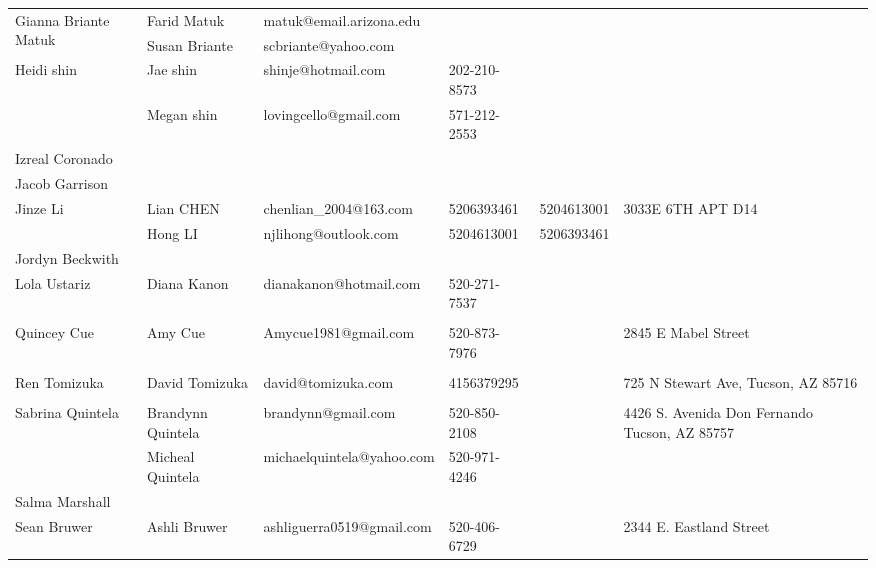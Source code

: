 \documentclass[landscape]{article}\usepackage[]{graphicx}\usepackage[]{color}
\begin{document}
\begin{longtable}{|p{100pt}|p{100pt}|p{140pt}|p{60pt}|p{64pt}|p{120pt}|}
\hline
\multirow{2}{100pt}{Gianna Briante Matuk} & Farid Matuk & matuk@email.arizona.edu &  &  & \multirow{2}{120pt}{} \\
 & Susan Briante & scbriante@yahoo.com &  &  & \\
\hline
\multirow{2}{100pt}{Heidi shin} & Jae shin & shinje@hotmail.com & 202-210-8573 &  & \multirow{2}{120pt}{} \\
 & Megan shin & lovingcello@gmail.com & 571-212-2553 &  & \\
\hline
\multirow{2}{100pt}{Izreal Coronado} &  &  &  &  & \multirow{2}{120pt}{} \\
 &  &  &  &  & \\
\hline
\multirow{2}{100pt}{Jacob Garrison} &  &  &  &  & \multirow{2}{120pt}{} \\
 &  &  &  &  & \\
\hline
\multirow{2}{100pt}{Jinze Li} & Lian CHEN & chenlian\_2004@163.com & 5206393461 & 5204613001 & \multirow{2}{120pt}{3033E 6TH APT D14} \\
 & Hong LI & njlihong@outlook.com & 5204613001 & 5206393461 & \\
\hline
\multirow{2}{100pt}{Jordyn Beckwith} &  &  &  &  & \multirow{2}{120pt}{} \\
 &  &  &  &  & \\
\hline
\multirow{2}{100pt}{Lola Ustariz} & Diana Kanon & dianakanon@hotmail.com & 520-271-7537 &  & \multirow{2}{120pt}{} \\
 &  &  &  &  & \\
\hline
\multirow{2}{100pt}{Quincey Cue} & Amy Cue & Amycue1981@gmail.com & 520-873-7976 &  & \multirow{2}{120pt}{2845 E Mabel Street } \\
 &  &  &  &  & \\
\hline
\multirow{2}{100pt}{Ren Tomizuka} & David Tomizuka & david@tomizuka.com & 4156379295 &  & \multirow{2}{120pt}{725 N Stewart Ave, Tucson, AZ 85716} \\
 &  &  &  &  & \\
\hline
\multirow{2}{100pt}{Sabrina Quintela} & Brandynn Quintela & brandynn@gmail.com & 520-850-2108 &  & \multirow{2}{120pt}{4426 S. Avenida Don Fernando Tucson, AZ 85757} \\
 & Micheal Quintela & michaelquintela@yahoo.com & 520-971-4246 &  & \\
\hline
\multirow{2}{100pt}{Salma Marshall} &  &  &  &  & \multirow{2}{120pt}{} \\
 &  &  &  &  & \\
\hline
\multirow{2}{100pt}{Sean Bruwer} & Ashli Bruwer & ashliguerra0519@gmail.com & 520-406-6729 &  & \multirow{2}{120pt}{2344 E. Eastland Street} \\

\end{longtable}
\end{document}
